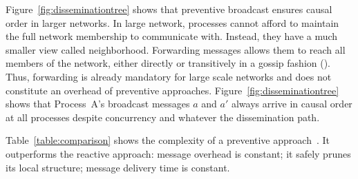 Figure~\ref{fig:disseminationtree} shows that preventive broadcast ensures
causal order in larger networks. In large network, processes cannot afford to
maintain the full network membership to communicate with. Instead, they have a
much smaller view called neighborhood. Forwarding messages allows them to reach
all members of the network, either directly or transitively in a gossip fashion
(\REF). Thus, forwarding is already mandatory for large scale networks and does
not constitute an overhead of preventive approaches.
Figure~\ref{fig:disseminationtree} shows that Process~A's broadcast messages $a$
and $a'$ always arrive in causal order at all processes despite concurrency and
whatever the dissemination path.



Table~\ref{table:comparison} shows the complexity of a preventive
approach~\cite{friedman2004causal}. It outperforms the reactive approach:
message overhead is constant; it safely prunes its local structure; message
delivery time is constant.


